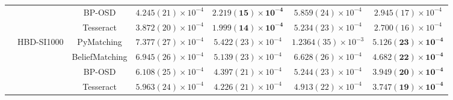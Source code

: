 \begin{tabular}{ccc|cccc}
     &  & BP-OSD & $4.245(21) \times 10^{-4}$ & $\mathbf{2.219(15) \times 10^{-4}}$ & $5.859(24) \times 10^{-4}$ & $2.945(17) \times 10^{-4}$ \\
     &  & Tesseract & $3.872(20) \times 10^{-4}$ & $\mathbf{1.999(14) \times 10^{-4}}$ & $5.234(23) \times 10^{-4}$ & $2.700(16) \times 10^{-4}$ \\
    \cline{2-7}
     & \multirow{4}{*}{HBD-SI1000} & PyMatching & $7.377(27) \times 10^{-4}$ & $5.422(23) \times 10^{-4}$ & $1.2364(35) \times 10^{-3}$ & $\mathbf{5.126(23) \times 10^{-4}}$ \\
     &  & BeliefMatching & $6.945(26) \times 10^{-4}$ & $5.139(23) \times 10^{-4}$ & $6.628(26) \times 10^{-4}$ & $\mathbf{4.682(22) \times 10^{-4}}$ \\
     &  & BP-OSD & $6.108(25) \times 10^{-4}$ & $4.397(21) \times 10^{-4}$ & $5.244(23) \times 10^{-4}$ & $\mathbf{3.949(20) \times 10^{-4}}$ \\
     &  & Tesseract & $5.963(24) \times 10^{-4}$ & $4.226(21) \times 10^{-4}$ & $4.913(22) \times 10^{-4}$ & $\mathbf{3.747(19) \times 10^{-4}}$ \\
\end{tabular}